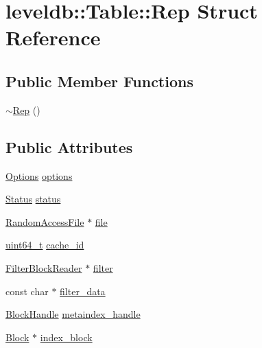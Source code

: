 \hypertarget{structleveldb_1_1_table_1_1_rep}{}\section{leveldb\+:\+:Table\+:\+:Rep Struct Reference}
\label{structleveldb_1_1_table_1_1_rep}
\subsection*{Public Member Functions}
\begin{DoxyCompactItemize}
\item 
\hyperlink{structleveldb_1_1_table_1_1_rep_a589eccb49554eb53054c95f5e6b5aac3}{$\sim$\+Rep} ()
\end{DoxyCompactItemize}
\subsection*{Public Attributes}
\begin{DoxyCompactItemize}
\item 
\hyperlink{structleveldb_1_1_options}{Options} \hyperlink{structleveldb_1_1_table_1_1_rep_a96ff2b389369e1b0706b090961065740}{options}
\item 
\hyperlink{classleveldb_1_1_status}{Status} \hyperlink{structleveldb_1_1_table_1_1_rep_aceaddad6024db9f34af2358503e4c089}{status}
\item 
\hyperlink{classleveldb_1_1_random_access_file}{Random\+Access\+File} $\ast$ \hyperlink{structleveldb_1_1_table_1_1_rep_a5b96b0d545bb3dbe2bccdefab1a83092}{file}
\item 
\hyperlink{stdint_8h_aaa5d1cd013383c889537491c3cfd9aad}{uint64\+\_\+t} \hyperlink{structleveldb_1_1_table_1_1_rep_af5beb2186a60560f5381271ad53420b8}{cache\+\_\+id}
\item 
\hyperlink{classleveldb_1_1_filter_block_reader}{Filter\+Block\+Reader} $\ast$ \hyperlink{structleveldb_1_1_table_1_1_rep_a35acf83732a3dea3df5869cb05c1cb5f}{filter}
\item 
const char $\ast$ \hyperlink{structleveldb_1_1_table_1_1_rep_a2dd458aa96c0a357414f13354810cea9}{filter\+\_\+data}
\item 
\hyperlink{classleveldb_1_1_block_handle}{Block\+Handle} \hyperlink{structleveldb_1_1_table_1_1_rep_a11500653a2db8ba301bca5027a508789}{metaindex\+\_\+handle}
\item 
\hyperlink{classleveldb_1_1_block}{Block} $\ast$ \hyperlink{structleveldb_1_1_table_1_1_rep_ae69d991c9b8ec7330b22acc06a932fe8}{index\+\_\+block}
\end{DoxyCompactItemize}


